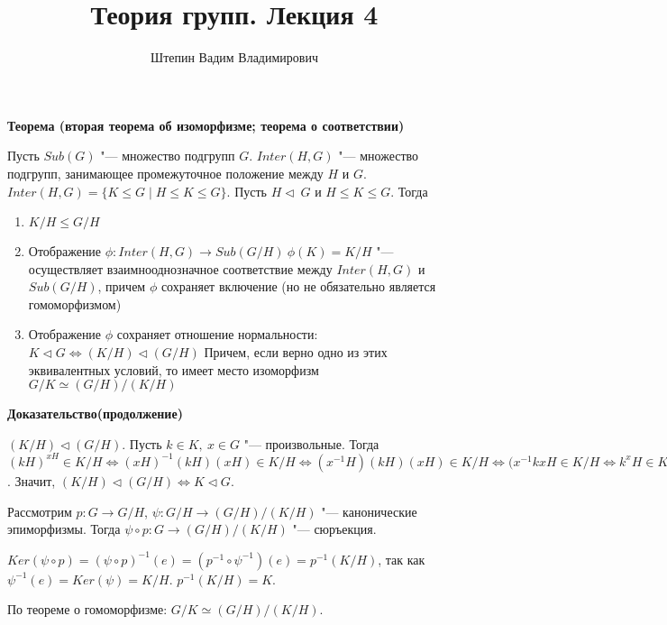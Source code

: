 \documentclass{article}
\title{Теория групп. Лекция 4}
\author{Штепин Вадим Владимирович}
\date{\DTMdate{2019-09-26}}
\begin{document}
\maketitle

\textbf{Теорема (вторая теорема об изоморфизме; теорема о соответствии)}

Пусть $Sub(G)$ "--- множество подгрупп $G$. $Inter(H, G)$ "--- множество подгрупп, занимающее промежуточное положение между $H$ и $G$. $Inter(H, G) = \{ K \leq G \mid H \leq K \leq G\}$. Пусть $H \triangleleft \ G$ и $H \leq K \leq G$. Тогда
\begin{enumerate}
	\item $K/H \leq G/H$
	\item Отображение $\phi: Inter(H, G) \rightarrow Sub(G/H) \  \phi(K) = K/H$ "--- осуществляет взаимнооднозначное соответствие между $Inter(H, G)$ и $Sub(G/H)$, причем $\phi$ сохраняет включение (но не обязательно является гомоморфизмом)
	\item Отображение $\phi$ сохраняет отношение нормальности: $K \triangleleft G \Leftrightarrow (K/H) \triangleleft (G/H)$
	Причем, если верно одно из этих эквивалентных условий, то имеет место изоморфизм $G/K \simeq (G/H)/(K/H)$
\end{enumerate}

\vspace{5pt}

\textbf{Доказательство(продолжение)}

$(K/H) \triangleleft (G/H)$. Пусть $k \in K, \  x \in G$ "--- произвольные. Тогда $(kH)^{xH} \in K/H \Leftrightarrow (xH)^{-1}(kH)(xH) \in K/H \Leftrightarrow (x^{-1}H)(kH)(xH) \in K/H \Leftrightarrow (x^{-1}kxH \in K/H \Leftrightarrow k^xH \in K/H \Leftrightarrow k^x \in K$. Значит, $(K/H) \triangleleft (G/H) \Leftrightarrow K \triangleleft G$.

Рассмотрим $p: G \rightarrow G/H$, $\psi : G/H \rightarrow (G/H)/(K/H)$ "--- канонические эпиморфизмы. Тогда $\psi \circ p: G \rightarrow (G/H)/(K/H)$ "--- сюръекция.

$Ker(\psi \circ p) = (\psi \circ p)^{-1}(e) = (p^{-1} \circ \psi^{-1})(e) = p^{-1}(K/H)$, так как $\psi^{-1}(e) = Ker(\psi) = K/H$. $p^{-1}(K/H) = K$.

По теореме о гомоморфизме:
$G/K \simeq (G/H)/(K/H)$.

\vspace{10pt}
\end{document}
